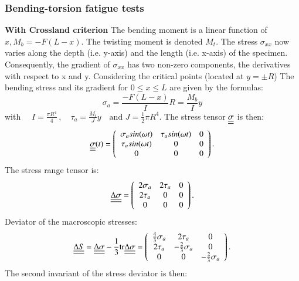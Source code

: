 \documentclass[3p,times,procedia,number]{elsarticle}
\begin{document}
\subsubsection{Bending-torsion fatigue tests}
\textbf{With Crossland criterion}
The bending moment is a linear function of $x, M_b= -F(L-x)$. The twisting moment is denoted $M_t$. The stress $\sigma_{xx}$ now varies along the depth (i.e. y-axis) and the length (i.e. x-axis) of the specimen. Consequently, the gradient of $\sigma_{xx}$ has two non-zero components, the derivatives with respect to x and y. Considering the critical points (located at
$y=\pm R$) The bending stress and its gradient for $0\leqslant x\leqslant L$ are given by the formulas: 
\begin{equation}
\sigma_{a}=\frac{-F(L-x)}{I}R=\frac{M_b}{I}y
\end{equation}
with $\quad I=\frac{\pi R^4}{4}\,,\quad 
\tau_{a}=\frac{M_t}{J}y \quad \text{and  }
J=\frac{1}{2}\pi R^4$.
The stress tensor $\uline{\uline{\sigma}}$ is then:
\begin{equation} 
\uline{\uline{\sigma}}(t)=
\left(
\begin{array}{ccc}
\sigma_{a}sin(\omega t) & \tau_asin(\omega t) & 0\\
\tau_asin(\omega t) & 0 & 0\\ 
0 & 0 & 0\\
\end{array}\right) .
\end{equation}
The stress range tensor is:
\begin{equation} 
\uline{\uline{\Delta\sigma}}=
\left(
\begin{array}{ccc}
2\sigma_a& 2\tau_a & 0\\
2\tau_a& 0 & 0\\ 
0 & 0 & 0\\
\end{array}\right) .
\end{equation}
Deviator of the macroscopic stresses:
\begin{equation} 
\uline{\uline{\Delta S}}=\uline{\uline{\Delta\sigma}}-\frac{1}{3}\textrm{tr}\uline{\uline{\Delta\sigma}}=
\left(
\begin{array}{ccc}
\frac{4}{3}\sigma_{a} & 2\tau_a & 0\\
2\tau_a & -\frac{2}{3}\sigma_a & 0\\ 
0 & 0 & -\frac{2}{3}\sigma_a\\
\end{array}\right) .
\end{equation}
The second invariant of the stress deviator is then:
\end{document}
